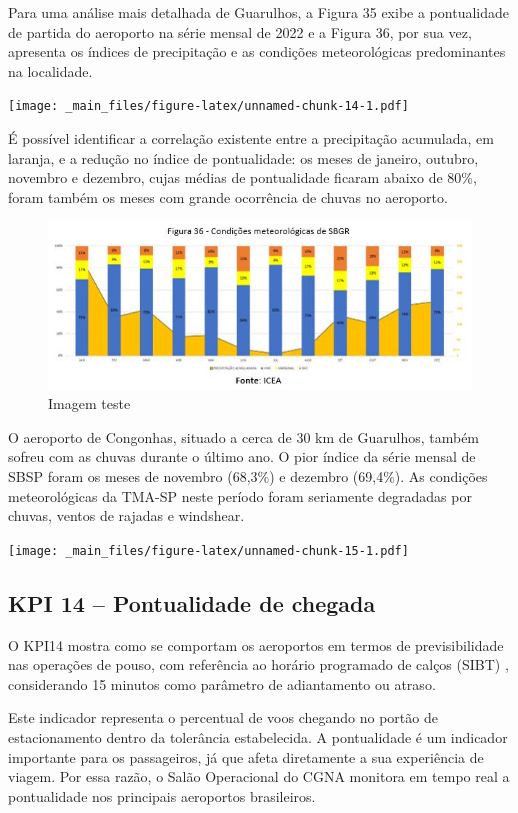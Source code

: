\documentclass[
]{book}
\begin{document}
Para uma análise mais detalhada de Guarulhos, a Figura 35 exibe a pontualidade de partida do aeroporto na série mensal de 2022 e a Figura 36, por sua vez, apresenta os índices de precipitação e as condições meteorológicas predominantes na localidade.

\texttt{[image: \_main\_files/figure-latex/unnamed-chunk-14-1.pdf]}

É possível identificar a correlação existente entre a precipitação acumulada, em laranja, e a redução no índice de pontualidade: os meses de janeiro, outubro, novembro e dezembro, cujas médias de pontualidade ficaram abaixo de 80\%, foram também os meses com grande ocorrência de chuvas no aeroporto.

\begin{figure}
\centering
\includegraphics{imagens/fig40.jpg}
\caption{Imagem teste}
\end{figure}

O aeroporto de Congonhas, situado a cerca de 30 km de Guarulhos, também sofreu com as chuvas durante o último ano. O pior índice da série mensal de SBSP foram os meses de novembro (68,3\%) e dezembro (69,4\%). As condições meteorológicas da TMA-SP neste período foram seriamente degradadas por chuvas, ventos de rajadas e windshear.

\texttt{[image: \_main\_files/figure-latex/unnamed-chunk-15-1.pdf]}

\hypertarget{kpi-14-pontualidade-de-chegada}{%
\subsection{KPI 14 -- Pontualidade de chegada}\label{kpi-14-pontualidade-de-chegada}}

O KPI14 mostra como se comportam os aeroportos em termos de previsibilidade nas operações de pouso, com referência ao horário programado de calços (SIBT) , considerando 15 minutos como parâmetro de adiantamento ou atraso.

Este indicador representa o percentual de voos chegando no portão de estacionamento dentro da tolerância estabelecida.
A pontualidade é um indicador importante para os passageiros, já que afeta diretamente a sua experiência de viagem. Por essa razão, o Salão Operacional do CGNA monitora em tempo real a pontualidade nos principais aeroportos brasileiros.
\end{document}
